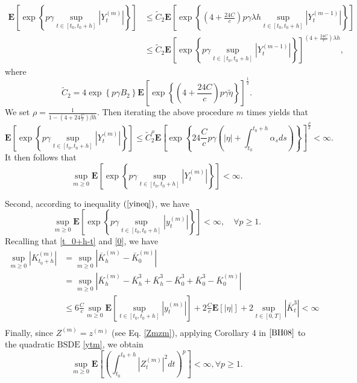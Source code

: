 \documentclass[10pt]{article}%
\numberwithin{equation}{section}
\begin{document}
$$
\begin{aligned}
	 \mathbf{E}\left[\exp \left\{p \gamma \sup _{t\in[t_0,t_0+h]}\left|Y_t^{(m)}\right|\right\}\right] &\leq \widetilde{C}_2 \mathbf{E}\left[\exp \left\{\left(4+\frac{24C}{c}\right) p \gamma \lambda h \sup _{t\in[t_0,t_0+h]}\left|Y_t^{(m-1)}\right|\right\}\right] \\
 &\leq \widetilde{C}_2 \mathbf{E}\left[\exp \left\{ p \gamma  \sup _{t\in[t_0,t_0+h]}\left|Y_t^{(m-1)}\right|\right\}\right]^{\left(4+\frac{24C}{c}\right)\lambda h},
\end{aligned}
$$
where $$\widetilde{C}_2=4 \exp\left\{p \gamma B_2\right\} \mathbf{E}\left[\exp\left\{\left(4+\frac{24C}{c}\right)p\gamma\widetilde{\eta}\right\}\right]^{\frac{1}{2}}.$$
We set $\rho=\frac{1}{1-\left(4+24\frac{C}{c}\right)\beta h}$.  Then iterating the above procedure $m$ times yields that
$$\mathbf{E}\left[\exp \left\{p \gamma \sup _{t\in[t_0,t_0+h]}\left|Y_t^{(m)}\right|\right\}\right]\leq
\widetilde{C}_2^{\rho} \mathbf{E}\left[\exp\left\{24\frac{C}{c}p\gamma\left(\left|\eta\right|+\int_{t_0}^{t_0+h}\alpha_s ds\right)\right\}\right]^{\frac{\rho}{2}}<\infty.$$
It then follows that $$\sup_{m\geq 0}\mathbf{E}\left [ \exp\left \{ p\gamma\sup_{t\in[t_0,t_0+h]}\left | Y_t^{(m)} \right |  \right \}   \right ] <\infty.$$

Second, according to  inequality $(\ref{yineq})$, we have
$$\sup _{m \geq 0} \mathbf{E}\left[\exp \left\{p \gamma \sup _{t\in[t_0,t_0+h]}\left|y_t^{(m)}\right|\right\}\right]<\infty, \quad \forall p \geq 1.$$
Recalling that \eqref{t_0+h-t} and \eqref{0},  we have %
$$
\begin{aligned}
\sup _{m \geq 0} \left|K_{t_0+h}^{(m)}\right| 
&=\sup _{m \geq 0} \left|\bar{K}_{h}^{(m)}-\bar{K}_{0}^{(m)}\right|\\
&=\sup _{m \geq 0} \left|\bar{K}_{h}^{(m)}-\bar{K}_{h}^{3}+\bar{K}_{h}^{3}-\bar{K}_{0}^{3}+\bar{K}_{0}^{3}-\bar{K}_{0}^{(m)}\right|\\
&\leq 6\frac{C}{c}\sup_{m \geq 0}\mathbf{E}\left[\sup _{t\in[t_0,t_0+h]}\left|y_t^{(m)}\right|\right]+2\frac{C}{c}\mathbf{E}\left[\left|\eta\right|\right]+2\sup_{t\in[0,T]}\left|\bar{K}^3_t\right|<\infty \\
\end{aligned}
$$
Finally, since $Z^{(m)}=z^{(m)}$ (see Eq. \eqref{Zmzm}), applying  Corollary 4 in $\cite{BH08}$ to the quadratic $\text{BSDE}$ \eqref{ytm}, we obtain 
$$
\sup _{m \geq 0} \mathbf{E}\left[\left(\int_{t_0}^{t_0+h}\left|Z_t^{(m)}\right|^2 d t\right)^p\right]<\infty, \forall p \geq 1.
$$
\fi
\end{document}
